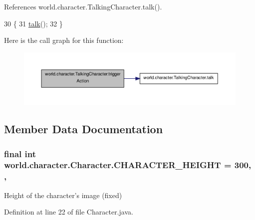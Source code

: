 References world.\-character.\-Talking\-Character.\-talk().


\begin{DoxyCode}
30                                 \{
31         \hyperlink{a00029_ac38a9c3d5a62edc8e8ae776410c834af}{talk}();
32     \}
\end{DoxyCode}


Here is the call graph for this function\-:
\nopagebreak
\begin{figure}[H]
\begin{center}
\leavevmode
\includegraphics[width=350pt]{a00029_a880e0de97bfae094b3d25a12c055cad2_cgraph}
\end{center}
\end{figure}




\subsection{Member Data Documentation}
\hypertarget{a00005_a31596c03022d61aeb8aac56f149309be}{
\subsubsection[{C\-H\-A\-R\-A\-C\-T\-E\-R\-\_\-\-H\-E\-I\-G\-H\-T}]{\setlength{\rightskip}{0pt plus 5cm}final int world.\-character.\-Character.\-C\-H\-A\-R\-A\-C\-T\-E\-R\-\_\-\-H\-E\-I\-G\-H\-T = 300\hspace{0.3cm}{\ttfamily [static]}, {\ttfamily [protected]}, {\ttfamily [inherited]}}}\label{a00005_a31596c03022d61aeb8aac56f149309be}


Height of the character's image (fixed) 



Definition at line 22 of file Character.\-java.



